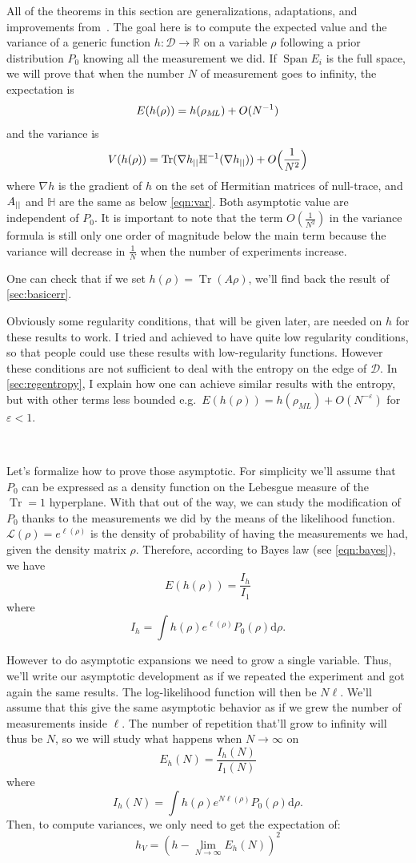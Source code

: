 \documentclass[10pt,a4paper]{report}
\theoremstyle{plain}
\theoremstyle{definition}
\theoremstyle{remark}
\newcommand{\R}{\ensuremath{\mathbb{R}}}
\newcommand{\dd}{\mathrm{d}}
\DeclareMathOperator{\Tr}{Tr}
\DeclareMathOperator{\Span}{Span}
\newcommand{\ml}{_{M\!L}}
\begin{document}
All of the theorems in this section are generalizations,
adaptations, and improvements from~\cite{SPRAL17}. The goal here is to compute
the expected value and the variance of a generic function $h : \mathcal{D} \to
\R$ on a variable $\rho$ following a prior distribution $P_0$
knowing all the measurement
we did. If $\Span E_i$ is the full space,
we will prove that when the number $N$ of measurement goes to infinity, the
expectation is
\[E(h(\rho)) = h(\rho\ml) + O(N\inv)\]
and the variance is
\[V(h(\rho)) = \Tr(\nabla h\pr \mathbb H\inv(\nabla h\pr)) +O\Big(\frac 1 {N^2}\Big)\]
where $\nabla h$ is the gradient of $h$ on the set of Hermitian
matrices of null-trace, and $A_{||}$ and $\mathbb H$ are the same as below
\cref{eqn:var}. Both asymptotic value are independent of $P_0$. It is important
to note that the term $O(\frac 1 {N^2})$ in the variance formula
is still only one order of magnitude below
the main term because the variance will decrease in $\frac 1 N$ when the number
of experiments increase.

One can check that if we set
$h(\rho) = \Tr(A\rho)$, we'll find back the result of \cref{sec:basicerr}.

Obviously some
regularity conditions, that will be given later, are needed on $h$ for these results
to work.
I tried and achieved to have quite low regularity conditions, so that people could
use these results with low-regularity functions. However these conditions are not
sufficient to deal with the entropy on the edge of $\mathcal{D}$. In
\cref{sec:regentropy}, I explain how one can achieve similar results with the
entropy, but with other terms less bounded e.g.\ $E(h(\rho)) = h(\rho\ml) +
O(N^{-\varepsilon})$ for $\varepsilon < 1$.

\

Let's formalize how to prove those asymptotic. For simplicity we'll assume that
$P_0$ can be expressed as a density function on the Lebesgue measure of the
$\Tr = 1$ hyperplane. With that out of the way, we can study the modification of
$P_0$ thanks to the measurements we did by the means of the likelihood function.
$\mathcal{L}(\rho) = e^{\ell(\rho)}$ is the density of probability of having
the measurements we had, given the density matrix $\rho$. Therefore, according to
Bayes law (see \cref{eqn:bayes}), we have
\[E(h(\rho)) = \frac{I_h}{I_1}\]
where
\[I_h = \int h(\rho) e^{\ell(\rho)} P_0(\rho) \dd \rho.\]

However to do asymptotic expansions we need to grow a single variable. Thus, we'll write our
asymptotic development as if we repeated the experiment and got again the same
results. The log-likelihood function will then be $N\ell$. We'll assume that this
give the same asymptotic behavior as if we grew the number of measurements inside
$\ell$. The number of repetition that'll grow to infinity will thus be $N$, so we
will study what happens when $N \to \infty$ on
\[E_h(N) = \frac{I_h(N)}{I_1(N)}\]
where
\[I_h(N) = \int h(\rho) e^{N\ell(\rho)} P_0(\rho) \dd \rho .\]
Then, to compute variances, we only need to get
the expectation of:
\[h_V = {\left(h - \lim_{N \to \infty} E_h(N)\right)}^2\]
\end{document}
